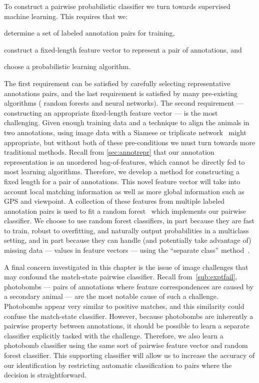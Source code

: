 \MatchStateExample{}

To construct a pairwise probabilistic classifier we turn towards supervised machine learning.
This requires that we:
\begin{enumin}
    \item determine a set of labeled annotation pairs for training,

    \item construct a fixed-length feature vector to represent a pair of annotations,  and

    \item choose a probabilistic learning algorithm.
\end{enumin}
The first requirement can be satisfied by carefully selecting representative annotations pairs, and the last
  requirement is satisfied by many pre-existing algorithms (\eg{} random forests and neural networks).
The second requirement --- constructing an appropriate fixed-length feature vector --- is the most challenging.
Given enough training data and a technique to align the animals in two annotations, using image data with a
  Siamese or triplicate network~\cite{taigman_deepface_2014,schroff_facenet_2015} might appropriate, but without
  both of these pre-conditions we must turn towards more traditional methods.
Recall from \cref{sec:annotrepr} that our annotation representation is an unordered bag-of-features, which cannot
  be directly fed to most learning algorithms.
Therefore, we develop a method for constructing a fixed length  for a pair of
  annotations.
This novel feature vector will take into account local matching information as well as more global information
  such as GPS and viewpoint.
A collection of these features from multiple labeled annotation pairs is used to fit a random
  forest~\cite{breiman_random_2001} which implements our pairwise classifier.
We choose to use random forest classifiers, in part because they are fast to train, robust to overfitting, and
  naturally output probabilities in a multiclass setting, and in part because they can handle (and potentially take
  advantage of) missing data --- \ie{} \nan{} values in feature vectors --- using the ``separate class''
  method~\cite{ding_investigation_2010}.
  

A final concern investigated in this chapter is the issue of image challenges that may confound the match-state
  pairwise classifier.
Recall from~\cref{sub:exptfail}, {photobombs} --- pairs of annotations where feature correspondences are caused
  by a secondary animal --- are the most notable cause of such a challenge.
Photobombs appear very similar to positive matches, and this similarity could confuse the match-state classifier.
However, because photobombs are inherently a pairwise property between annotations, it should be possible to
  learn a separate classifier explicitly tasked with the challenge.
Therefore, we also learn a photobomb classifier using the same sort of pairwise feature vector and random forest
  classifier.
This supporting classifier will allow us to increase the accuracy of our identification by restricting automatic
  classification to pairs where the decision is straightforward.


